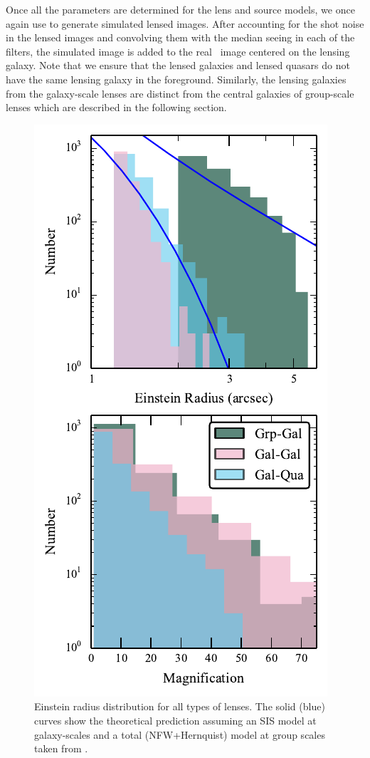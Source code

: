 \documentclass[useAMS,usenatbib,a4paper]{mn2e}
\begin{document}
Once all the parameters are determined for the lens and source models, we once
again use \gravlens to generate simulated lensed images.  After accounting for the shot
noise in the lensed images and convolving them with the median seeing in each of
the filters, the simulated image is added to the real \cfhtls~image centered
on the lensing galaxy. Note that we ensure that the lensed galaxies and
lensed quasars do not have the same lensing galaxy in the foreground. Similarly,
the lensing galaxies from the galaxy-scale lenses are distinct from the central
galaxies of group-scale lenses which are described in the following section.


\begin{figure}
\begin{center}
\includegraphics[scale=1.2]{distrib_remu.pdf}
\caption{ \label{fig:remudist}
Einstein radius distribution for all types of lenses. The solid (blue)
curves show the theoretical prediction assuming an SIS model at galaxy-scales
and a total (NFW+Hernquist) model at group scales taken from \citep{More2012}.
}
\end{center}
\end{figure}
\end{document}
